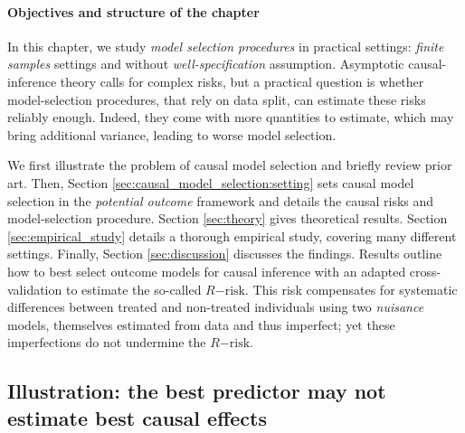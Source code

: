 \documentclass[french,12pt,twoside,a4paper]{book}
\begin{document}
\paragraph{Objectives and structure of the chapter}

In this chapter, we study \textit{model selection procedures}
in practical settings: \textit{finite samples} settings and without
\textit{well-specification} assumption. Asymptotic causal-inference
theory calls for complex risks, but a practical question is
whether model-selection procedures, that rely on data split, can estimate
these risks reliably enough. Indeed, they
come with more quantities to estimate, which may
bring additional variance, leading to worse model selection.

We first illustrate the problem of causal model
selection and briefly review prior art. Then, Section
\ref{sec:causal_model_selection:setting} sets causal model selection in the
\emph{potential outcome} framework and details the causal risks and
model-selection procedure. Section \ref{sec:theory} gives theoretical
results. Section \ref{sec:empirical_study} details a thorough empirical
study, covering many different settings. Finally, Section \ref{sec:discussion}
discusses the findings.
%
Results outline how to best select outcome models for causal
inference with an adapted
cross-validation to estimate the so-called $R\mathrm{-risk}$.
This risk compensates for systematic
differences between treated and non-treated individuals using
two \emph{nuisance} models,
themselves estimated from data and thus imperfect; yet these
imperfections do not undermine the $R\mathrm{-risk}$.


\subsection{Illustration: the best predictor may not estimate best causal
  effects}%
\label{subsec:causal_model_selection:illustration}%
\end{document}
